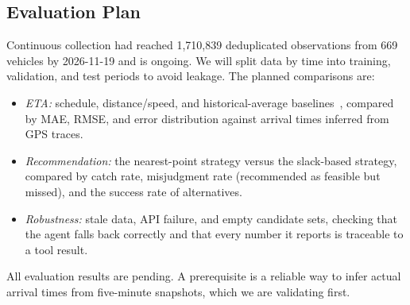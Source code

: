 \subsection{Evaluation Plan}
Continuous collection had reached 1{,}710{,}839 deduplicated observations
from 669 vehicles by 2026-11-19 and is ongoing. We will split data by
time into training, validation, and test periods to avoid leakage. The
planned comparisons are:
\begin{itemize}
  \item \emph{ETA:} schedule, distance/speed, and historical-average
        baselines~\cite{rawat2026bus}, compared by MAE, RMSE, and error
        distribution against arrival times inferred from GPS traces.
  \item \emph{Recommendation:} the nearest-point strategy versus the
        slack-based strategy, compared by catch rate, misjudgment rate
        (recommended as feasible but missed), and the success rate of
        alternatives.
  \item \emph{Robustness:} stale data, API failure, and empty candidate
        sets, checking that the agent falls back correctly and that every
        number it reports is traceable to a tool result.
\end{itemize}
All evaluation results are pending. A prerequisite is a reliable way to
infer actual arrival times from five-minute snapshots, which we are
validating first.
